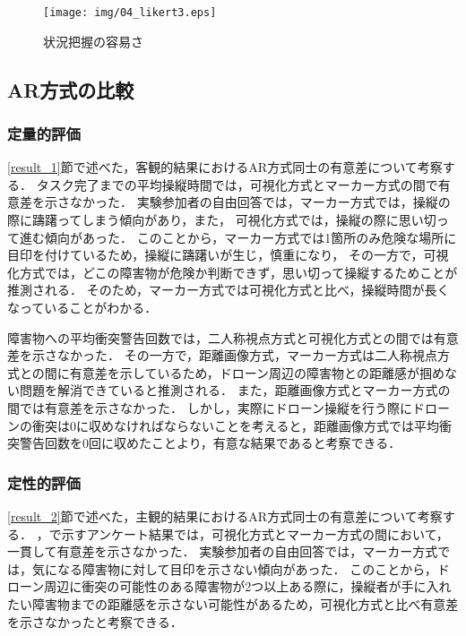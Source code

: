 \documentclass[submit, sigrecommended]{ipsj}
\begin{document}

\begin{figure}[tb]
  \centering
  \texttt{[image: img/04\_likert3.eps]}
  \caption{状況把握の容易さ}
  \label{fig:04_likert3}
  \end{figure}


\subsection{AR方式の比較}
\subsubsection{定量的評価}
\ref{result_1}節で述べた，客観的結果におけるAR方式同士の有意差について考察する．
タスク完了までの平均操縦時間では，可視化方式とマーカー方式の間で有意差を示さなかった．
実験参加者の自由回答では，マーカー方式では，操縦の際に躊躇ってしまう傾向があり，また，
可視化方式では，操縦の際に思い切って進む傾向があった．
このことから，マーカー方式では1箇所のみ危険な場所に目印を付けているため，操縦に躊躇いが生じ，慎重になり，
その一方で，可視化方式では，どこの障害物が危険か判断できず，思い切って操縦するためことが推測される．
そのため，マーカー方式では可視化方式と比べ，操縦時間が長くなっていることがわかる．
\par
障害物への平均衝突警告回数では，二人称視点方式と可視化方式との間では有意差を示さなかった．
その一方で，距離画像方式，マーカー方式は二人称視点方式との間に有意差を示しているため，ドローン周辺の障害物との距離感が掴めない問題を解消できていると推測される．
また，距離画像方式とマーカー方式の間では有意差を示さなかった．
しかし，実際にドローン操縦を行う際にドローンの衝突は0に収めなければならないことを考えると，距離画像方式では平均衝突警告回数を0回に収めたことより，有意な結果であると考察できる．

\subsubsection{定性的評価}
\ref{result_2}節で述べた，主観的結果におけるAR方式同士の有意差について考察する．
，で示すアンケート結果では，可視化方式とマーカー方式の間において，一貫して有意差を示さなかった．
実験参加者の自由回答では，マーカー方式では，気になる障害物に対して目印を示さない傾向があった．
このことから，ドローン周辺に衝突の可能性のある障害物が2つ以上ある際に，操縦者が手に入れたい障害物までの距離感を示さない可能性があるため，可視化方式と比べ有意差を示さなかったと考察できる．
\end{document}
